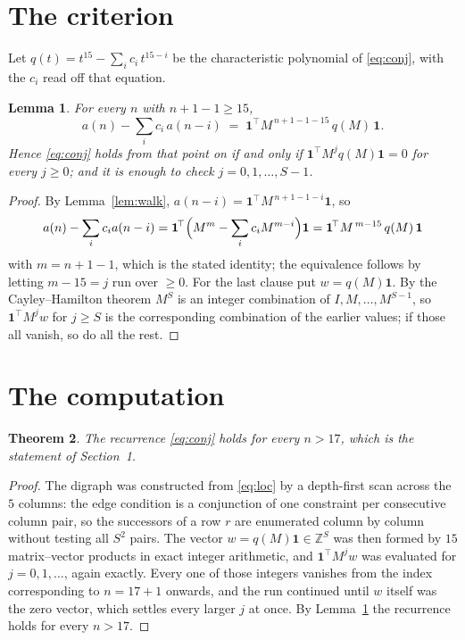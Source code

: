 \documentclass[11pt,a4paper]{article}
\theoremstyle{plain}
\newtheorem{theorem}{Theorem}
\newtheorem{lemma}[theorem]{Lemma}
\theoremstyle{definition}
\begin{document}
\section{The criterion}

Let $q(t)=t^{15}-\sum_i c_i\,t^{15-i}$ be the characteristic polynomial of
\eqref{eq:conj}, with the $c_i$ read off that equation.

\begin{lemma}\label{lem:crit}
For every $n$ with $n+1-1\ge15$,
\[
a(n)-\sum_i c_i\,a(n-i)\;=\;\mathbf{1}^{\!\top}M^{\,n+1-1-15}\,q(M)\,\mathbf{1} .
\]
Hence \eqref{eq:conj} holds from that point on if and only if
$\mathbf{1}^{\!\top}M^{j}q(M)\mathbf{1}=0$ for every $j\ge0$; and it is enough to check
$j=0,1,\dots,S-1$.
\end{lemma}

\begin{proof}
By Lemma~\ref{lem:walk}, $a(n-i)=\mathbf{1}^{\!\top}M^{\,n+1-1-i}\mathbf{1}$, so
\[
a(n)-\sum_i c_i a(n-i)
=\mathbf{1}^{\!\top}\Bigl(M^{m}-\sum_i c_i M^{m-i}\Bigr)\mathbf{1}
=\mathbf{1}^{\!\top}M^{\,m-15}\,q(M)\,\mathbf{1}
\]
with $m=n+1-1$, which is the stated identity; the equivalence follows by letting
$m-15=j$ run over $\ge0$. For the last clause put $w=q(M)\mathbf{1}$. By the
Cayley--Hamilton theorem $M^{S}$ is an integer combination of $I,M,\dots,M^{S-1}$, so
$\mathbf{1}^{\!\top}M^{j}w$ for $j\ge S$ is the corresponding combination of the earlier
values; if those all vanish, so do all the rest.
\end{proof}

\section{The computation}

\begin{theorem}
The recurrence \eqref{eq:conj} holds for every $n>17$, which is the statement of
Section~1.
\end{theorem}

\begin{proof}
The digraph was constructed from \eqref{eq:loc} by a depth-first scan across the $5$
columns: the edge condition is a conjunction of one constraint per consecutive column
pair, so the successors of a row $r$ are enumerated column by column without testing all
$S^2$ pairs. The vector $w=q(M)\mathbf{1}\in\mathbb{Z}^{S}$ was then formed by $15$
matrix--vector products in exact integer arithmetic, and $\mathbf{1}^{\!\top}M^{j}w$ was
evaluated for $j=0,1,\dots$, again exactly. Every one of those integers vanishes from the
index corresponding to $n=17+1$ onwards, and the run continued until $w$ itself was the
zero vector, which settles every larger $j$ at once. By Lemma~\ref{lem:crit} the recurrence
holds for every $n>17$.
\end{proof}
\end{document}
